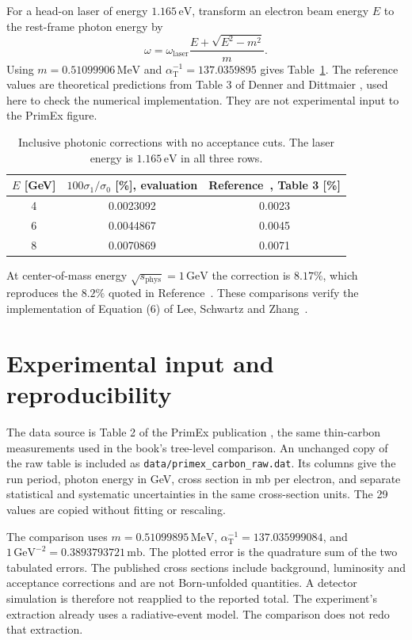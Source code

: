 For a head-on laser of energy $1.165\,\mathrm{eV}$, transform an
electron beam energy $E$ to the rest-frame photon energy by
\begin{equation}
 \omega=\omega_{\mathrm{laser}}
                  \frac{E+\sqrt{E^2-m^2}}m.
\end{equation}
Using $m=0.51099906\,\mathrm{MeV}$ and
$\alpha_{\mathrm T}^{-1}=137.0359895$ gives
Table~\ref{tab:compton-nlo-benchmark}. The reference values are
theoretical predictions from Table 3 of Denner and Dittmaier
\cite{qed-processes-denner}, used here to check the numerical
implementation. They are not experimental input to the PrimEx figure.
\begin{table}[!htbp]
 \centering
 \begin{tabular}{ccc}
 \toprule
 $E$ [GeV] & $100\sigma_1/\sigma_0$ [\%], evaluation
          & Reference~\cite{qed-processes-denner}, Table 3 [\%]\\
 \midrule
 4 & 0.0023092 & 0.0023\\
 6 & 0.0044867 & 0.0045\\
 8 & 0.0070869 & 0.0071\\
 \bottomrule
 \end{tabular}
 \caption{Inclusive photonic corrections with no acceptance cuts.
 The laser energy is $1.165\,\mathrm{eV}$ in all three rows.}
 \label{tab:compton-nlo-benchmark}
\end{table}

At center-of-mass energy
$\sqrt{s_{\mathrm{phys}}}=1\,\mathrm{GeV}$ the correction is $8.17\%$, which
reproduces the $8.2\%$ quoted in Reference~\cite{qed-processes-lsz}.
These comparisons verify the implementation of Equation (6) of
Lee, Schwartz and Zhang~\cite{qed-processes-lsz}.

\section{Experimental input and reproducibility}
The data source is Table 2 of the PrimEx publication
\cite{qed-processes-primex}, the same thin-carbon measurements used
in the book's tree-level comparison. An unchanged copy of the raw table is included as
\nolinkurl{data/primex_carbon_raw.dat}. Its columns give the run period,
photon energy in GeV, cross section in mb per electron, and separate
statistical and systematic uncertainties in the same cross-section
units. The 29 values are copied without fitting or rescaling.

The comparison uses $m=0.51099895\,\mathrm{MeV}$,
$\alpha_{\mathrm T}^{-1}=137.035999084$, and
$1\,\mathrm{GeV}^{-2}=0.3893793721\,\mathrm{mb}$.
The plotted error is the quadrature sum of the two tabulated errors.
The published cross sections include background, luminosity and
acceptance corrections and are not Born-unfolded quantities.
A detector simulation is therefore not reapplied to the reported
total. The experiment's extraction already uses a radiative-event
model. The comparison does not redo that extraction.

